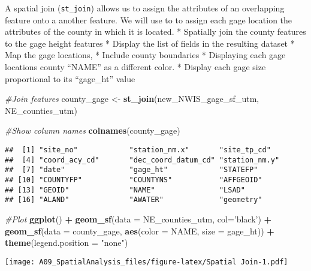 \documentclass[]{article}
\newenvironment{Shaded}{\begin{snugshade}}{\end{snugshade}}
\newcommand{\KeywordTok}[1]{\textcolor[rgb]{0.13,0.29,0.53}{\textbf{#1}}}
\newcommand{\DataTypeTok}[1]{\textcolor[rgb]{0.13,0.29,0.53}{#1}}
\newcommand{\StringTok}[1]{\textcolor[rgb]{0.31,0.60,0.02}{#1}}
\newcommand{\CommentTok}[1]{\textcolor[rgb]{0.56,0.35,0.01}{\textit{#1}}}
\newcommand{\OperatorTok}[1]{\textcolor[rgb]{0.81,0.36,0.00}{\textbf{#1}}}
\newcommand{\NormalTok}[1]{#1}
\begin{document}
A spatial join (\texttt{st\_join}) allows us to assign the attributes of
an overlapping feature onto a another feature. We will use to to assign
each gage location the attributes of the county in which it is located.
* Spatially join the county features to the gage height features *
Display the list of fields in the resulting dataset * Map the gage
locations, * Include county boundaries * Displaying each gage locations
county ``NAME'' as a different color. * Display each gage size
proportional to its ``gage\_ht'' value

\begin{Shaded}
\begin{Highlighting}[]
\CommentTok{#Join features}
\NormalTok{county_gage <-}\StringTok{ }\KeywordTok{st_join}\NormalTok{(new_NWIS_gage_sf_utm, NE_counties_utm)}

\CommentTok{#Show column names}
\KeywordTok{colnames}\NormalTok{(county_gage)}
\end{Highlighting}
\end{Shaded}

\begin{verbatim}
##  [1] "site_no"            "station_nm.x"       "site_tp_cd"        
##  [4] "coord_acy_cd"       "dec_coord_datum_cd" "station_nm.y"      
##  [7] "date"               "gage_ht"            "STATEFP"           
## [10] "COUNTYFP"           "COUNTYNS"           "AFFGEOID"          
## [13] "GEOID"              "NAME"               "LSAD"              
## [16] "ALAND"              "AWATER"             "geometry"
\end{verbatim}

\begin{Shaded}
\begin{Highlighting}[]
\CommentTok{#Plot}
\KeywordTok{ggplot}\NormalTok{() }\OperatorTok{+}
\StringTok{  }\KeywordTok{geom_sf}\NormalTok{(}\DataTypeTok{data =}\NormalTok{ NE_counties_utm, }\DataTypeTok{col=}\StringTok{'black'}\NormalTok{) }\OperatorTok{+}
\StringTok{  }\KeywordTok{geom_sf}\NormalTok{(}\DataTypeTok{data =}\NormalTok{ county_gage, }\KeywordTok{aes}\NormalTok{(}\DataTypeTok{color =}\NormalTok{ NAME, }\DataTypeTok{size =}\NormalTok{ gage_ht)) }\OperatorTok{+}
\StringTok{  }\KeywordTok{theme}\NormalTok{(}\DataTypeTok{legend.position =} \StringTok{"none"}\NormalTok{)}
\end{Highlighting}
\end{Shaded}

\texttt{[image: A09\_SpatialAnalysis\_files/figure-latex/Spatial Join-1.pdf]}
\end{document}

